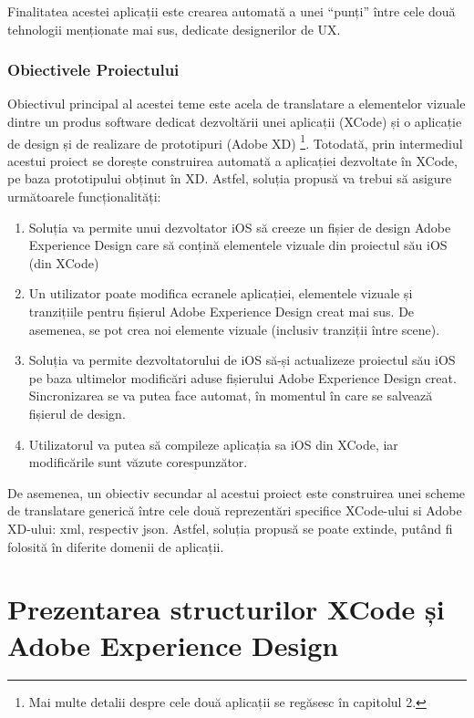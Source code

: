 Finalitatea acestei aplicații este crearea automată  a unei “punți” între cele două tehnologii menționate mai sus, dedicate designerilor de UX.

\subsection{Obiectivele Proiectului}
\label{sub-sec:proj-objectives}

Obiectivul principal al acestei teme este acela de translatare a elementelor vizuale dintre un produs software dedicat dezvoltării unei aplicații (XCode) și o aplicație de design și de realizare de prototipuri (Adobe XD) \footnote{Mai multe detalii despre cele două aplicații se regăsesc în capitolul 2.}. Totodată, prin intermediul acestui proiect se dorește construirea automată a aplicației dezvoltate în XCode, pe baza prototipului obținut în XD.
Astfel, soluția propusă va trebui să asigure următoarele funcționalități:

\begin{enumerate}
\item Soluția va permite unui dezvoltator iOS să creeze un fișier de design Adobe Experience Design care să conțină elementele vizuale din proiectul său iOS (din XCode)
\item Un utilizator poate modifica ecranele aplicației, elementele vizuale și tranzițiile pentru fișierul Adobe Experience Design creat mai sus. De asemenea, se pot crea noi elemente vizuale (inclusiv tranziții între scene).
\item Soluția va permite dezvoltatorului de iOS să-și actualizeze proiectul său iOS pe baza ultimelor modificări aduse fișierului Adobe Experience Design creat. Sincronizarea se va putea face automat, în momentul în care se salvează fișierul de design. 
\item  Utilizatorul va putea să compileze aplicația sa iOS din XCode, iar modificările sunt văzute corespunzător. 
\end{enumerate}

De asemenea, un obiectiv secundar al acestui proiect este construirea unei scheme de translatare generică între cele două reprezentări specifice XCode-ului si Adobe XD-ului: xml, respectiv json.
Astfel, soluția propusă se poate extinde, putând fi folosită în diferite domenii de aplicații.


\chapter{Prezentarea structurilor XCode și Adobe Experience Design}


